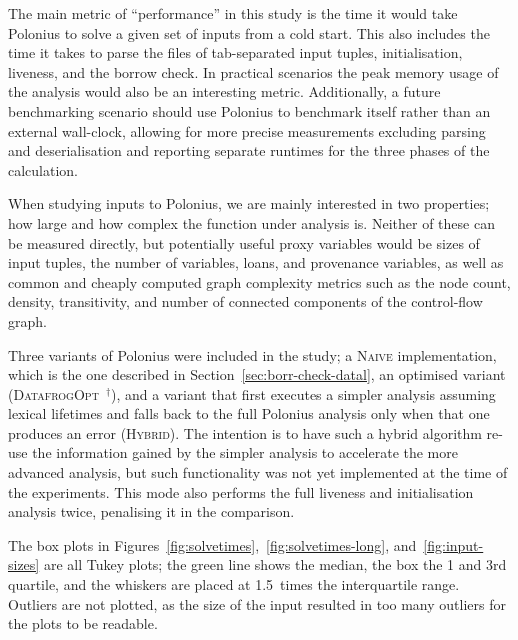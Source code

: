 \documentclass[11pt,a4paper,twoside,openany]{report}
\newcommand{\notmine}[0] {$^\dagger$}
\begin{document}
The main metric of ``performance'' in this study is the time it would take
Polonius to solve a given set of inputs from a cold start. This also includes
the time it takes to parse the files of tab-separated input tuples,
initialisation, liveness, and the borrow check. In practical scenarios the peak
memory usage of the analysis would also be an interesting metric. Additionally,
a future benchmarking scenario should use Polonius to benchmark itself rather
than an external wall-clock, allowing for more precise measurements excluding
parsing and deserialisation and reporting separate runtimes for the three
phases of the calculation.

When studying inputs to Polonius, we are mainly interested in two properties;
how large and how complex the function under analysis is. Neither of these can
be measured directly, but potentially useful proxy variables would be sizes of
input tuples, the number of variables, loans, and provenance variables, as well
as common and cheaply computed graph complexity metrics such as the node count,
density, transitivity, and number of connected components of the control-flow
graph.

Three variants of Polonius were included in the study; a \textsc{Naive}
implementation, which is the one described in
Section~\ref{sec:borr-check-datal}, an optimised variant
(\textsc{DatafrogOpt}~\notmine{}), and a variant that first executes a simpler
analysis assuming lexical lifetimes and falls back to the full Polonius analysis
only when that one produces an error (\textsc{Hybrid}). The intention is to have
such a hybrid algorithm re-use the information gained by the simpler analysis to
accelerate the more advanced analysis, but such functionality was not yet
implemented at the time of the experiments. This mode also performs the full
liveness and initialisation analysis twice, penalising it in the
comparison.

The box plots in Figures~\ref{fig:solvetimes},~\ref{fig:solvetimes-long},
and~\ref{fig:input-sizes} are all Tukey plots; the green line shows the median,
the box the 1 and 3rd quartile, and the whiskers are placed at 1.5~times the
interquartile range. Outliers are not plotted, as the size of the input resulted
in too many outliers for the plots to be readable.
\end{document}
